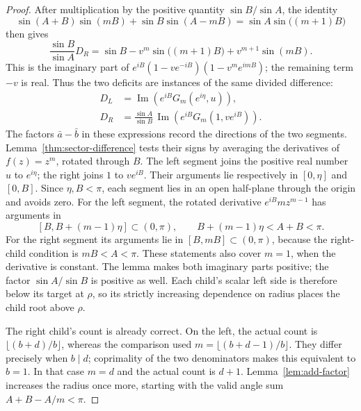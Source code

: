 \documentclass[11pt,a4paper]{article}
\theoremstyle{definition}
\theoremstyle{remark}
\numberwithin{equation}{section}
\begin{document}
\begin{proof}
After multiplication by the positive quantity $\sin B/\sin A$, the identity
\[
 \sin(A+B)\sin(mB)+\sin B\sin(A-mB)
       =\sin A\sin\bigl((m+1)B\bigr)
\]
then gives
\[
 \frac{\sin B}{\sin A}D_R
   =\sin B-v^m\sin\bigl((m+1)B\bigr)+v^{m+1}\sin(mB).
\]
This is the imaginary part of
$e^{iB}(1-ve^{-iB})(1-v^me^{imB})$; the remaining term $-v$ is real.
Thus the two deficits are instances of the same divided difference:
\begin{equation}\label{eq:mediant-differences}
 \begin{split}
 D_L&=\operatorname{Im}\!\left(e^{iB}G_m(e^{i\eta},u)\right),\\
 D_R&=\frac{\sin A}{\sin B}\,
       \operatorname{Im}\!\left(e^{iB}G_m(1,ve^{iB})\right).
 \end{split}
\end{equation}
The factors $\bar a-\bar b$ in these expressions record the directions
of the two segments. Lemma~\ref{thm:sector-difference} tests their signs
by averaging the derivatives of $f(z)=z^m$, rotated through $B$.
The left segment joins the positive real number $u$ to $e^{i\eta}$;
the right joins $1$ to $ve^{iB}$.  Their arguments lie respectively in
$[0,\eta]$ and $[0,B]$.  Since $\eta,B<\pi$, each segment lies in an open
half-plane through the origin and avoids zero.
For the left segment, the rotated derivative $e^{iB}mz^{m-1}$ has arguments in
\[
 [B,B+(m-1)\eta]\subset(0,\pi),
 \qquad B+(m-1)\eta<A+B<\pi.
\]
For the right segment its arguments lie in $[B,mB]\subset(0,\pi)$,
because the right-child condition is $mB<A<\pi$.
These statements also cover $m=1$, when the derivative is constant.
The lemma makes both imaginary parts positive; the factor $\sin A/\sin B$
is positive as well.  Each child's scalar left side is therefore below its
target at $\rho$, so its strictly increasing dependence on radius places
the child root above $\rho$.

The right child's count is already correct.  On the left, the actual count
is $\lfloor(b+d)/b\rfloor$, whereas the comparison used
$m=\lfloor(b+d-1)/b\rfloor$.
They differ precisely when $b\mid d$; coprimality of the two denominators
makes this equivalent to $b=1$.
In that case $m=d$ and the actual count is $d+1$.
Lemma~\ref{lem:add-factor} increases the radius once more, starting with
the valid angle sum $A+B-A/m<\pi$.
\end{proof}
\end{document}
